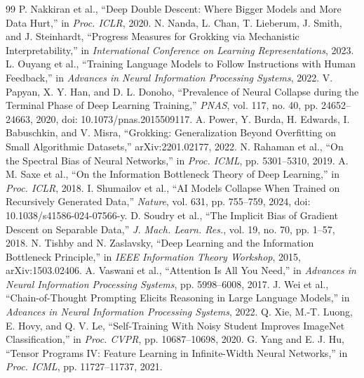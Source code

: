 \documentclass{article}
\begin{document}
\begin{thebibliography}{99}
 P. Nakkiran et al., ``Deep Double Descent: Where Bigger Models and More Data Hurt,'' in \emph{Proc. ICLR}, 2020.
 N. Nanda, L. Chan, T. Lieberum, J. Smith, and J. Steinhardt, ``Progress Measures for Grokking via Mechanistic Interpretability,'' in \emph{International Conference on Learning Representations}, 2023.
 L. Ouyang et al., ``Training Language Models to Follow Instructions with Human Feedback,'' in \emph{Advances in Neural Information Processing Systems}, 2022.
 V. Papyan, X. Y. Han, and D. L. Donoho, ``Prevalence of Neural Collapse during the Terminal Phase of Deep Learning Training,'' \emph{PNAS}, vol. 117, no. 40, pp. 24652--24663, 2020, doi: 10.1073/pnas.2015509117.
 A. Power, Y. Burda, H. Edwards, I. Babuschkin, and V. Misra, ``Grokking: Generalization Beyond Overfitting on Small Algorithmic Datasets,'' arXiv:2201.02177, 2022.
 N. Rahaman et al., ``On the Spectral Bias of Neural Networks,'' in \emph{Proc. ICML}, pp. 5301--5310, 2019.
 A. M. Saxe et al., ``On the Information Bottleneck Theory of Deep Learning,'' in \emph{Proc. ICLR}, 2018.
 I. Shumailov et al., ``AI Models Collapse When Trained on Recursively Generated Data,'' \emph{Nature}, vol. 631, pp. 755--759, 2024, doi: 10.1038/s41586-024-07566-y.
 D. Soudry et al., ``The Implicit Bias of Gradient Descent on Separable Data,'' \emph{J. Mach. Learn. Res.}, vol. 19, no. 70, pp. 1--57, 2018.
 N. Tishby and N. Zaslavsky, ``Deep Learning and the Information Bottleneck Principle,'' in \emph{IEEE Information Theory Workshop}, 2015, arXiv:1503.02406.
 A. Vaswani et al., ``Attention Is All You Need,'' in \emph{Advances in Neural Information Processing Systems}, pp. 5998--6008, 2017.
 J. Wei et al., ``Chain-of-Thought Prompting Elicits Reasoning in Large Language Models,'' in \emph{Advances in Neural Information Processing Systems}, 2022.
 Q. Xie, M.-T. Luong, E. Hovy, and Q. V. Le, ``Self-Training With Noisy Student Improves ImageNet Classification,'' in \emph{Proc. CVPR}, pp. 10687--10698, 2020.
 G. Yang and E. J. Hu, ``Tensor Programs IV: Feature Learning in Infinite-Width Neural Networks,'' in \emph{Proc. ICML}, pp. 11727--11737, 2021.
\end{thebibliography}
\end{document}
